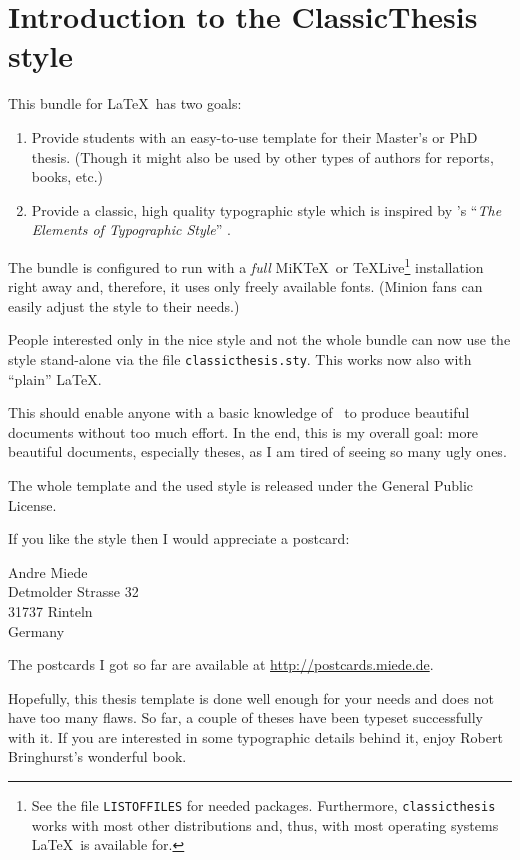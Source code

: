 \chapter{Introduction to the ClassicThesis style}\label{ch:introduction}
This bundle for \LaTeX\ has two goals:
\begin{enumerate}
    \item Provide students with an easy-to-use template for their
    Master's
    or PhD thesis. (Though it might also be used by other types of
    authors
    for reports, books, etc.)
    \item Provide a classic, high quality typographic style which is
    inspired by 's ``\emph{The Elements of
    Typographic Style}'' \citep{bringhurst:2002}.
    \graffito{\myTitle \myVersion}
\end{enumerate}
The bundle is configured to run with a \emph{full} 
MiK\TeX\ or \TeX Live\footnote{See the file \texttt{LISTOFFILES} for
needed packages. Furthermore, \texttt{classicthesis} 
works with most other distributions and, thus, with most operating 
systems \LaTeX\ is available for.} 
installation right away and, therefore, it uses only freely available 
fonts. (Minion fans can easily adjust the style to their needs.)

People interested only in the nice style and not the whole bundle can
now use the style stand-alone via the file \texttt{classicthesis.sty}.
This works now also with ``plain'' \LaTeX.

This should enable anyone with a basic knowledge of \LaTeXe\ to
produce beautiful documents without too much effort. In the end, this
is my overall goal: more beautiful documents, especially theses, as I
am tired of seeing so many ugly ones.

The whole template and the used style is released under the
 General Public License. 

If you like the style then I would appreciate a postcard:
\begin{center}
 Andre Miede \\
 Detmolder Strasse 32 \\
 31737 Rinteln \\
 Germany
\end{center}
The postcards I got so far are available at \url{http://postcards.miede.de}.

Hopefully, this thesis template is done well enough for your needs and
does not have too many flaws. So far, a couple of theses have been
typeset successfully with it. If you are interested in some
typographic details behind it, enjoy Robert Bringhurst's wonderful book.

